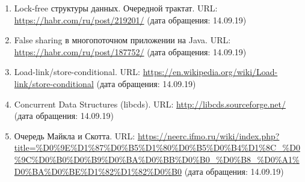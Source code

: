 {\begin{enumerate}
		 память: история и развитие. URL: \url{https://habr.com/ru/post/221667/} (дата обращения: 14.02.19).
		. Модель акторов. URL: \url{https://ru.wikipedia.org/wiki/%D0%9C%D0%BE%D0%B4%D0%B5%D0%BB%D1%8C_%D0%B0%D0%BA%D1%82%D0%BE%D1%80%D0%BE%D0%B2} (дата обращения: 14.02.19).
		, Томас Х. и др. Алгоритмы: построение и анализ, 3-е изд. : Пер. с англ. - М. : ООО ''И. Д. Вильямс'', 2013. - 1328 с. : ил. - Парал. тит. англ.
		\item Lock-free структуры данных. Очередной трактат. URL: \url{https://habr.com/ru/post/219201/} (дата обращения: 14.09.19)
		\item False sharing в многопоточном приложении на Java. URL: \url{https://habr.com/ru/post/187752/} (дата обращения: 14.09.19)
		\item Load-link/store-conditional. URL: \url{https://en.wikipedia.org/wiki/Load-link/store-conditional} (дата обращения: 14.09.19)
		\item Concurrent Data Structures (libcds). URL: \url{http://libcds.sourceforge.net/} (дата обращения: 14.09.19)
		\item Очередь Майкла и Скотта. URL: \url{https://neerc.ifmo.ru/wiki/index.php?title=%D0%9E%D1%87%D0%B5%D1%80%D0%B5%D0%B4%D1%8C_%D0%9C%D0%B0%D0%B9%D0%BA%D0%BB%D0%B0_%D0%B8_%D0%A1%D0%BA%D0%BE%D1%82%D1%82%D0%B0} (дата обращения: 14.09.19)
	\end{enumerate}
}